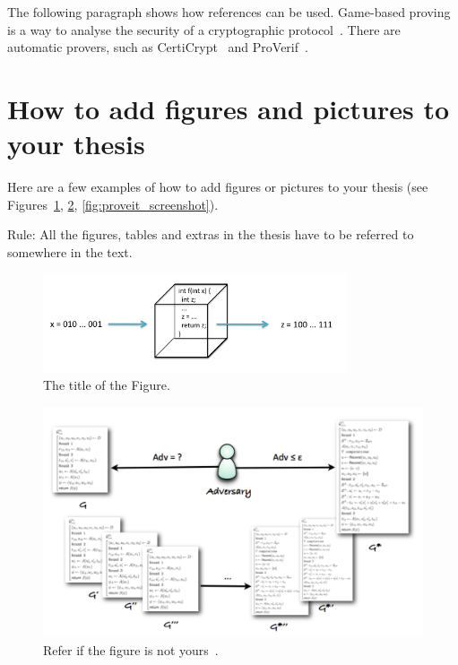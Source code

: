 \documentclass[estonian,english]{unitartucs-thesis} %
\begin{document}
The following paragraph shows how references can be used. Game-based proving is a way to analyse the security of a cryptographic protocol~\cite{GameB_1, GameB_2}. There are automatic provers, such as {CertiCrypt\-}~\cite{certicrypt} and ProVerif~\cite{proVerif}.



\newpage
\section{How to add figures and pictures to your thesis}


Here are a few examples of how to add figures or pictures to your thesis (see Figures~\ref{fig:fnCompModel}, \ref{fig:game-based_proofs}, \ref{fig:proveit_screenshot}).

Rule: All the figures, tables and extras in the thesis have to be referred to somewhere in the text.


\begin{figure} [ht] %
\begin{center}
\includegraphics[width=0.8\textwidth]{computational_model_function}
\caption{The title of the Figure.}
\label{fig:fnCompModel}
\end{center}
\end{figure}



\begin{figure} [!ht] %
\begin{center}
\includegraphics[width=\textwidth]{game-based_proofs}
\caption{Refer if the figure is not yours~\cite{kamm12}.}
\label{fig:game-based_proofs}
\end{center}
\end{figure}
\end{document}
